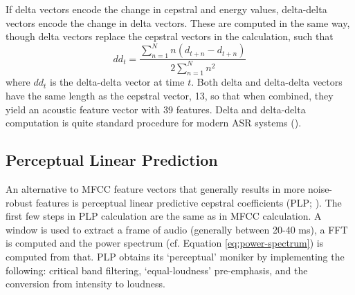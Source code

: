 If delta vectors encode the change in cepstral and energy values, delta-delta vectors encode the change in delta vectors.  These are computed in the same way, though delta vectors replace the cepstral vectors in the calculation, such that \begin{equation} dd_t = \dfrac{\sum_{n=1}^{N} n(d_{t+n} - d_{t+n})}{2\sum_{n=1}^{N} n^2} \end{equation} where $dd_t$ is the delta-delta vector at time $t$.  Both delta and delta-delta vectors have the same length as the cepstral vector, 13, so that when combined, they yield an acoustic feature vector with 39 features.  %
Delta and delta-delta computation is quite standard procedure for modern ASR systems (\cite{htk:15}).


\DIFdelbegin \subsubsection{}%
\addtocounter{subsubsection}{-1}%
\DIFdelend \DIFaddbegin \subsection{Perceptual Linear Prediction}\DIFaddend \label{sec:plp}

An alternative to MFCC feature vectors that generally results in more noise-robust features is perceptual linear predictive cepstral coefficients (PLP; \cite{hermansky:85}).  The first few steps in PLP calculation are the same as in MFCC calculation.  A window is used to extract a frame of audio (generally between 20-40 ms), a FFT is computed and the power spectrum (cf. Equation \ref{eq:power-spectrum}) is computed from that.  PLP obtains its `perceptual' moniker by implementing the following: critical band filtering, `equal-loudness' pre-emphasis, and the conversion from intensity to loudness.  

